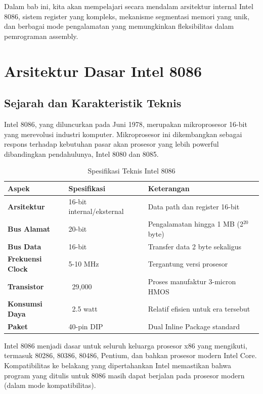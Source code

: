 Dalam bab ini, kita akan mempelajari secara mendalam arsitektur internal Intel 8086, sistem register yang kompleks, mekanisme segmentasi memori yang unik, dan berbagai mode pengalamatan yang memungkinkan fleksibilitas dalam pemrograman assembly.

\section{Arsitektur Dasar Intel 8086}

\subsection{Sejarah dan Karakteristik Teknis}
Intel 8086, yang diluncurkan pada Juni 1978, merupakan mikroprosesor 16-bit yang merevolusi industri komputer. Mikroprosesor ini dikembangkan sebagai respons terhadap kebutuhan pasar akan prosesor yang lebih powerful dibandingkan pendahulunya, Intel 8080 dan 8085.

\begin{table}[h]
\centering
\caption{Spesifikasi Teknis Intel 8086}
\begin{tabular}{|p{4cm}|p{3cm}|p{8cm}|}
\hline
\textbf{Aspek} & \textbf{Spesifikasi} & \textbf{Keterangan} \\
\hline
\textbf{Arsitektur} & 16-bit internal/eksternal & Data path dan register 16-bit \\
\hline
\textbf{Bus Alamat} & 20-bit & Pengalamatan hingga 1 MB (2$^{20}$ byte) \\
\hline
\textbf{Bus Data} & 16-bit & Transfer data 2 byte sekaligus \\
\hline
\textbf{Frekuensi Clock} & 5-10 MHz & Tergantung versi prosesor \\
\hline
\textbf{Transistor} & ~29,000 & Proses manufaktur 3-micron HMOS \\
\hline
\textbf{Konsumsi Daya} & ~2.5 watt & Relatif efisien untuk era tersebut \\
\hline
\textbf{Paket} & 40-pin DIP & Dual Inline Package standard \\
\hline
\end{tabular}
\label{tab:8086-specifications}
\end{table}

Intel 8086 menjadi dasar untuk seluruh keluarga prosesor x86 yang mengikuti, termasuk 80286, 80386, 80486, Pentium, dan bahkan prosesor modern Intel Core. Kompatibilitas ke belakang yang dipertahankan Intel memastikan bahwa program yang ditulis untuk 8086 masih dapat berjalan pada prosesor modern (dalam mode kompatibilitas).

